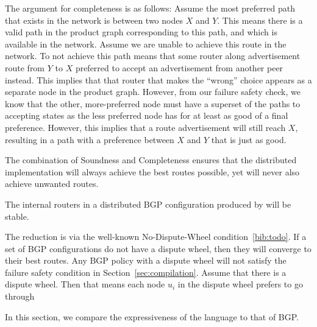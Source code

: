 The argument for completeness is as follows: Assume the most preferred path that exists in the network is between two nodes $X$ and $Y$.  This means there is a valid path in the product graph corresponding to this path, and which is available in the network. 
Assume we are unable to achieve this route in the network. To not achieve this path means that some router along advertisement route from $Y$ to $X$ preferred to accept an advertisement from another peer instead. This implies that that router that makes the ``wrong'' choice appears as a separate node in the product graph. However, from our failure safety check, we know that the other, more-preferred node must have a superset of the paths to accepting states as the less preferred node has for at least as good of a final preference. However, this implies that a route advertisement will still reach $X$, resulting in a path with a preference between $X$ and $Y$ that is just as good.

The combination of Soundness and Completeness ensures that the distributed implementation will always achieve the best routes possible, yet will never also achieve unwanted routes. 

\begin{defn}
The internal routers in a distributed BGP configuration produced by \sysname will be stable. 
\end{defn}

The reduction is via the well-known No-Dispute-Wheel condition~\ref{bib:todo}. If a set of BGP configurations do not have a dispute wheel, then they will converge to their best routes. Any BGP policy with a dispute wheel will not satisfy the failure safety condition in Section~\ref{sec:compilation}. Assume that there is a dispute wheel. Then that means each node $u_i$ in the dispute wheel prefers to go through 



In this section, we compare the expressiveness of the \sysname language to that of BGP.


